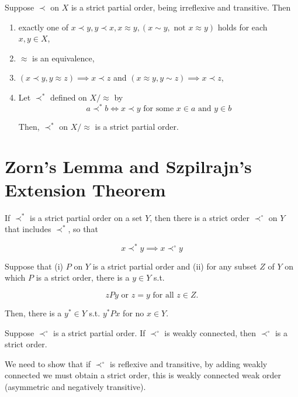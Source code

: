 \documentclass{article}
\theoremstyle{definition}
\def\tor{\text{ or }}
\def\tnot{\text{ not }}
\def\tforall{\text{ for all }}
\begin{document}
 Suppose $\prec$ on $X$ is a strict partial order, being irreflexive and transitive. Then

\begin{enumerate}
\item exactly one of $x\prec y,y\prec x,x\approx y, (x\sim y,\tnot x\approx y)$ holds for each $x,y\in X$,
\item $\approx$ is an equivalence,
\item $(x\prec y,y\approx z)\implies x\prec z$ and $(x\approx y,y\sim z)\implies x\prec z$,
\item Let $\prec^*$ defined on $X/\approx$ by
\begin{equation*}
a\prec^* b\iff x\prec y\text{ for some $x\in a$ and $y\in b$}
\end{equation*}

Then, $\prec^*$ on $X/\approx$ is a strict partial order.
\end{enumerate}

\section{Zorn's Lemma and Szpilrajn's Extension Theorem}

 If $\prec^*$ is a strict partial order on a set $Y$, then there is a strict order $\prec^\circ$ on $Y$ that includes $\prec^*$, so that

\begin{equation*}
x\prec^* y\implies x\prec^\circ y
\end{equation*}

 Suppose that (i) $P$ on $Y$ is a strict partial order and (ii) for any subset $Z$ of $Y$ on which $P$ is a strict order, there is a $y\in Y$ s.t.

\begin{equation*}
zPy\tor z=y\tforall z\in Z.
\end{equation*}

Then, there is a $y^*\in Y$ s.t. $y^*Px$ for no $x\in Y$.

\def\precs{\prec^\circ}

 Suppose $\prec^\circ$ is a strict partial order. If $\prec^\circ$ is weakly connected, then $\prec^\circ$ is a strict order.

 We need to show that if $\prec^\circ$ is reflexive and transitive, by adding weakly connected we must obtain a strict order, this is weakly connected weak order (asymmetric and negatively transitive).
\end{document}
